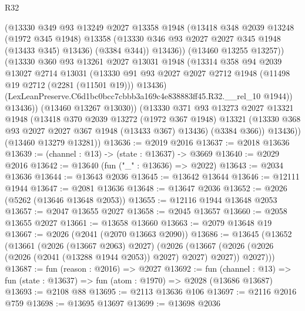 \begin{lexlean}{R32}
\begin{coremodule}
                (@13330
                  @349
                  @93
                  @13249
                  @2027
                  @13358
                  @1948
                  (@13418
                    @348
                    @2039
                    @13248
                    (@1972 @345 @1948)
                    @13358
                    (@13330 @346 @93 @2027 @2027 @345 @1948 (@13433 @345) @13436)
                    (@3384 @344))
                  @13436))
              (@13460 @13255 @13257))
            (@13330
              @360
              @93
              @13261
              @2027
              @13031
              @1948
              (@13314
                @358
                @94
                @2039
                @13027
                @2714
                @13031
                (@13330
                  @91
                  @93
                  @2027
                  @2027
                  @2712
                  @1948
                  (@11498 @19 @2712 (@2281 (@11501 @19)))
                  @13436)
                (LexLeanPreserve.C6d1bc0bcc7cbbb3a169c4e838883ff45.R32.__rel_10 @1944))
              @13436))
          (@13460 @13267 @13030))
        (@13330
          @371
          @93
          @13273
          @2027
          @13321
          @1948
          (@13418
            @370
            @2039
            @13272
            (@1972 @367 @1948)
            @13321
            (@13330 @368 @93 @2027 @2027 @367 @1948 (@13433 @367) @13436)
            (@3384 @366))
          @13436))
      (@13460 @13279 @13281))
@13636 := @2019 @2016
@13637 := @2018 @13636
@13639 := (channel : @13) -> (state : @13637) -> @3669
@13640 := @2029 @2016
@13642 := @13640 (fun ("_" : @13636) => @2022)
@13643 := @2034 @13636
@13644 := @13643 @2036
@13645 := @13642 @13644
@13646 := @12111 @1944
@13647 := @2081 @13636
@13648 := @13647 @2036
@13652 := @2026 (@5262 (@13646 @13648 @2053))
@13655 := @12116 @1944 @13648 @2053
@13657 := @2047 @13655 @2027
@13658 := @2045 @13657
@13660 := @2058 @13655 @2027
@13661 := @13658 @13660
@13663 := @2079 @13648 @19
@13667 := @2026 (@2041 (@2070 @13663 @2090))
@13686 := @13645
    (@13652
      (@13661
        (@2026 (@13667 @2063) @2027)
        (@2026
          (@13667 (@2026 (@2026 (@2026 (@2041 (@13288 @1944 @2053)) @2027) @2027) @2027))
          @2027)))
@13687 := fun (reason : @2016) => @2027
@13692 := fun (channel : @13) => fun (state : @13637) => fun (atom : @1970) => @2028 (@13686 @13687)
@13693 := @2108 @88
@13695 := @2113 @13636 @106
@13697 := @2116 @2016 @759
@13698 := @13695 @13697
@13699 := @13698 @2036

\end{coremodule}
\end{lexlean}
